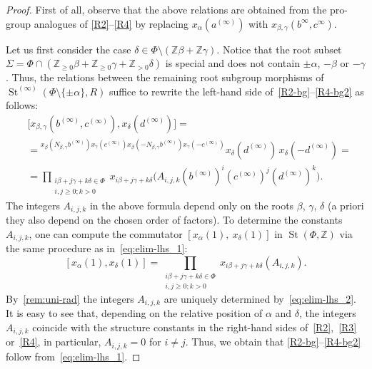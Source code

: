 \documentclass{article}
\numberwithin{equation}{section}
\theoremstyle{definition}
\theoremstyle{remark}
\DeclareMathOperator\St{St}
\newcommand{\ZZ}{\mathbb{Z}}
\newcommand{\up}[2]{{^{#1}\!{#2}}}
\begin{document}
\begin{proof}
 First of all, observe that the above relations are obtained from the pro-group analogues of \eqref{R2}--\eqref{R4} by replacing $x_\alpha(a^{(\infty)})$ with $x_{\beta, \gamma}(b^{\infty}, c^{\infty})$.
 
 Let us first consider the case \(\delta \in \Phi \setminus (\ZZ \beta + \ZZ \gamma)\).
 Notice that the root subset $\Sigma = \Phi \cap (\ZZ_{\geq 0}\beta + \ZZ_{\geq 0}\gamma + \ZZ_{>0}\delta)$ is special and does not contain $\pm\alpha$, $-\beta$ or $-\gamma$. Thus, the relations between the remaining root subgroup morphisms of $\St^{(\infty)}(\Phi\setminus\{\pm\alpha\}, R)$ suffice to rewrite the left-hand side of~\eqref{R2-bg}--\eqref{R4-bg2} as follows:
 \begin{align}
  &\bigl[x_{\beta, \gamma}(b^{(\infty)}, c^{(\infty)}), x_\delta(d^{(\infty)})\bigr] = \label{eq:elim-lhs_1} \\
  &= \up{x_\beta(N_{\beta, \gamma} b^{(\infty)})
   x_\gamma(c^{(\infty)})
   x_\beta(-N_{\beta, \gamma} b^{(\infty)})
   x_\gamma(-c^{(\infty)})}
  {x_\delta(d^{(\infty)})}\,
  x_\delta(-d^{(\infty)}) = \nonumber \\
  &= \prod_{\substack{i\beta + j\gamma + k\delta \in \Phi\\ i, j \geq 0; k > 0}}
  x_{i\beta + j\gamma + k\delta} \bigl(A_{i, j, k} (b^{(\infty)})^i (c^{(\infty)})^j (d^{(\infty)})^k\bigr). \nonumber
 \end{align}
 The integers \(A_{i, j, k}\) in the above formula depend only on the roots \(\beta\), \(\gamma\), \(\delta\) (a priori they also depend on the chosen order of factors). To determine the constants $A_{i,j,k}$, one can compute the commutator $[x_\alpha(1),\ x_\delta(1)]$ in $\St(\Phi, \ZZ)$ via the same procedure as in~\eqref{eq:elim-lhs_1}:
 \begin{equation} \label{eq:elim-lhs_2}
  [x_\alpha(1), x_\delta(1)] = \prod_{\substack{i\beta + j\gamma + k\delta \in \Phi\\ i, j \geq 0; k > 0}}
  x_{i\beta + j\gamma + k\delta}(A_{i, j, k}).
 \end{equation}
  By~\cref{rem:uni-rad} the integers $A_{i,j,k}$ are uniquely determined by~\eqref{eq:elim-lhs_2}.
  It is easy to see that, depending on the relative position of $\alpha$ and $\delta$, the integers $A_{i,j,k}$ coincide with the structure constants in the right-hand sides of~\eqref{R2},~\eqref{R3} or~\eqref{R4}, in particular, $A_{i,j,k}=0$ for $i\neq j$.
  Thus, we obtain that \eqref{R2-bg}--\eqref{R4-bg2} follow from~\eqref{eq:elim-lhs_1}.
 

\end{proof}
\end{document}
